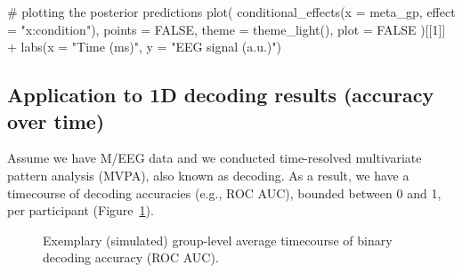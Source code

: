 \documentclass[
  doc,
  floatsintext,
  longtable,
  a4paper,
  nolmodern,
  notxfonts,
  notimes,
  colorlinks=true,linkcolor=blue,citecolor=blue,urlcolor=blue]{apa7}
\newenvironment{Shaded}{\begin{snugshade}}{\end{snugshade}}
\newcommand{\AttributeTok}[1]{\textcolor[rgb]{0.40,0.45,0.13}{#1}}
\newcommand{\CommentTok}[1]{\textcolor[rgb]{0.37,0.37,0.37}{#1}}
\newcommand{\ConstantTok}[1]{\textcolor[rgb]{0.56,0.35,0.01}{#1}}
\newcommand{\DecValTok}[1]{\textcolor[rgb]{0.68,0.00,0.00}{#1}}
\newcommand{\FunctionTok}[1]{\textcolor[rgb]{0.28,0.35,0.67}{#1}}
\newcommand{\NormalTok}[1]{\textcolor[rgb]{0.00,0.23,0.31}{#1}}
\newcommand{\SpecialCharTok}[1]{\textcolor[rgb]{0.37,0.37,0.37}{#1}}
\newcommand{\StringTok}[1]{\textcolor[rgb]{0.13,0.47,0.30}{#1}}
\begin{document}
\begin{Shaded}
\begin{Highlighting}[]
\CommentTok{\# plotting the posterior predictions}
\FunctionTok{plot}\NormalTok{(}
    \FunctionTok{conditional\_effects}\NormalTok{(}\AttributeTok{x =}\NormalTok{ meta\_gp, }\AttributeTok{effect =} \StringTok{"x:condition"}\NormalTok{),}
    \AttributeTok{points =} \ConstantTok{FALSE}\NormalTok{, }\AttributeTok{theme =} \FunctionTok{theme\_light}\NormalTok{(), }\AttributeTok{plot =} \ConstantTok{FALSE}
\NormalTok{    )[[}\DecValTok{1}\NormalTok{]] }\SpecialCharTok{+}
    \FunctionTok{labs}\NormalTok{(}\AttributeTok{x =} \StringTok{"Time (ms)"}\NormalTok{, }\AttributeTok{y =} \StringTok{"EEG signal (a.u.)"}\NormalTok{)}
\end{Highlighting}
\end{Shaded}

\subsection{Application to 1D decoding results (accuracy over
time)}\label{application-to-1d-decoding-results-accuracy-over-time}

Assume we have M/EEG data and we conducted time-resolved multivariate
pattern analysis (MVPA), also known as decoding. As a result, we have a
timecourse of decoding accuracies (e.g., ROC AUC), bounded between 0 and
1, per participant (Figure~\ref{fig-sim-decoding}).

\begin{figure}[!htb]

\caption{\label{fig-sim-decoding}Exemplary (simulated) group-level
average timecourse of binary decoding accuracy (ROC AUC).}


\end{figure}%
\end{document}
